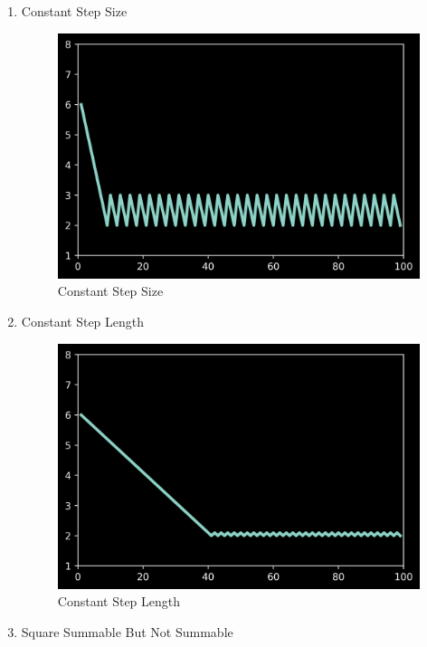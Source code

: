 \documentclass[twoside,twocolumn]{article}
\begin{document}
\begin{enumerate}
    \item Constant Step Size
    \begin{figure}[H]
        \centering
        \includegraphics[scale=0.5]{../../step/constantstepsize.png}
        \caption{Constant Step Size}
        \label{constantstepsize}
    \end{figure}
    \item Constant Step Length
    \begin{figure}[H]
        \centering
        \includegraphics[scale=0.5]{../../step/constantsteplength.png}
        \caption{Constant Step Length}
        \label{constantsteplength}
    \end{figure}
    \item Square Summable But Not Summable
    \begin{figure}[H]

\end{figure}
\end{enumerate}
\end{document}

